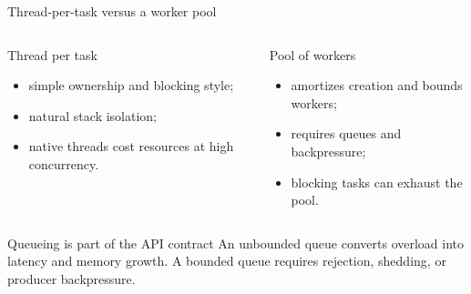\documentclass[aspectratio=169,11pt]{beamer}
\begin{document}
\begin{frame}{Thread-per-task versus a worker pool}
  \begin{columns}[T,onlytextwidth]
      \begin{block}{Thread per task}
        \begin{itemize}
          \item simple ownership and blocking style;
          \item natural stack isolation;
          \item native threads cost resources at high concurrency.
        \end{itemize}
      \end{block}
      \begin{block}{Pool of workers}
        \begin{itemize}
          \item amortizes creation and bounds workers;
          \item requires queues and backpressure;
          \item blocking tasks can exhaust the pool.
        \end{itemize}
      \end{block}
  \end{columns}
  \begin{alertblock}{Queueing is part of the API contract}
    An unbounded queue converts overload into latency and memory growth. A bounded queue requires rejection, shedding, or producer backpressure.
  \end{alertblock}
\end{frame}
\end{document}
